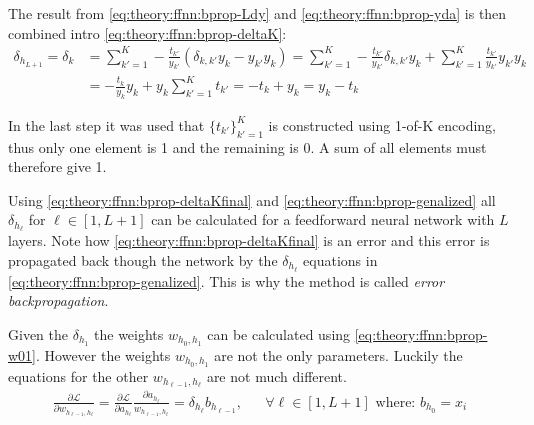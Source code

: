 The result from \eqref{eq:theory:ffnn:bprop-Ldy} and \eqref{eq:theory:ffnn:bprop-yda} is then combined intro \eqref{eq:theory:ffnn:bprop-deltaK}:
\begin{equation}
\begin{aligned}
\delta_{h_{L + 1}} = \delta_k &= \sum_{k'=1}^K -\frac{t_{k'}}{y_{k'}} \left( \delta_{k, k'} y_k - y_{k'} y_k \right) = \sum_{k'=1}^K -\frac{t_{k'}}{y_{k'}} \delta_{k, k'} y_k + \sum_{k'=1}^K \frac{t_{k'}}{y_{k'}} y_{k'} y_k \\
&= -\frac{t_k}{y_k} y_k + y_k \sum_{k'=1}^K t_{k'} = -t_k + y_k = y_k - t_k
\end{aligned}
\label{eq:theory:ffnn:bprop-deltaKfinal}
\end{equation}

In the last step it was used that $\{ t_{k'} \}_{k'=1}^K$ is constructed using 1-of-K encoding, thus only one element is 1 and the remaining is 0. A sum of all elements must therefore give 1.

Using \eqref{eq:theory:ffnn:bprop-deltaKfinal} and \eqref{eq:theory:ffnn:bprop-genalized} all $\delta_{h_\ell}$ for $\ell \in [1, L+1]$ can be calculated for a feedforward neural network with $L$ layers. Note how \eqref{eq:theory:ffnn:bprop-deltaKfinal} is an error and this error is propagated back though the network by the $\delta_{h_\ell}$ equations in \eqref{eq:theory:ffnn:bprop-genalized}. This is why the method is called \textit{error backpropagation}.

Given the $\delta_{h_1}$ the weights $w_{h_0, h_1}$ can be calculated using \eqref{eq:theory:ffnn:bprop-w01}. However the weights $w_{h_0, h_1}$ are not the only parameters. Luckily the equations for the other $w_{h_{\ell-1}, h_\ell}$ are not much different.
\begin{equation}
\begin{aligned}
\frac{\partial \mathcal{L}}{\partial w_{h_{\ell-1}, h_\ell}} = \frac{\partial \mathcal{L}}{\partial a_{h_\ell}}
\frac{\partial a_{h_\ell}}{w_{h_{\ell-1}, h_\ell}} = \delta_{h_\ell} b_{h_{\ell-1}}, && \forall \ell \in [1, L+1] \text{ where: } b_{h_0} = x_i
\end{aligned}
\end{equation}

